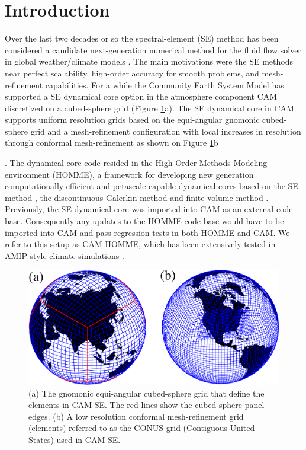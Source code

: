 \documentclass{agujournal}
\begin{document}
\section{Introduction}
Over the last two decades or so the spectral-element (SE) method has been considered a candidate next-generation numerical method for the fluid flow solver in  global weather/climate models \citep{FT2004MWR,BWTF2006MWR,KG2012JCP,GKC2013SIAM} {\color{red}{other references needed?}}. The main motivations were the SE methods near perfect scalability, high-order accuracy for smooth problems, and mesh-refinement capabilities. For a while the Community Earth System Model \citep[CESM; ][]{CESM1} has supported a SE dynamical core option in the atmosphere component CAM \citep[Community Atmosphere Model; ][]{CAM5} discretized on a cubed-sphere grid (Figure \ref{fig:grids}a). The SE dynamical core in CAM supports uniform resolution grids based on the equi-angular gnomonic cubed-sphere grid and a mesh-refinement configuration with local increases in resolution through conformal mesh-refinement as shown on Figure \ref{fig:grids}b {\citep{FT2004MWR,BWTF2006MWR,ZJT2013,ZetAl2014JCb}. The dynamical core code resided in the High-Order Methods Modeling environment (HOMME), a framework for developing new generation computationally efficient and petascale capable dynamical cores based on the SE method \citep{TL2000JSC,TES2008JPCS}, the discontinuous Galerkin method \citep{NCT2009CF} and finite-volume method \citep{ELGT2012PCS,LTOUNGK2017MWR}. Previously, the SE dynamical core was imported into CAM as an external code base. Consequently any updates to the HOMME code base would have to be imported into CAM and pass regression tests in both HOMME and CAM. We refer to this setup as CAM-HOMME, which has been extensively tested in AMIP-style climate simulations \citep{ELMNTT2012JC,BetAl2013JC,RetAl2015GRL}.
  \begin{figure}[h]
\centering
 \includegraphics[scale=0.45]{figs/grids}
 \caption{(a) The gnomonic equi-angular cubed-sphere grid that define the elements in CAM-SE. The red lines show the cubed-sphere panel edges. (b) A low resolution conformal mesh-refinement grid (elements) referred to as the CONUS-grid (Contiguous United States) used in CAM-SE.}
 \label{fig:grids}
\end{figure}

}
\end{document}
